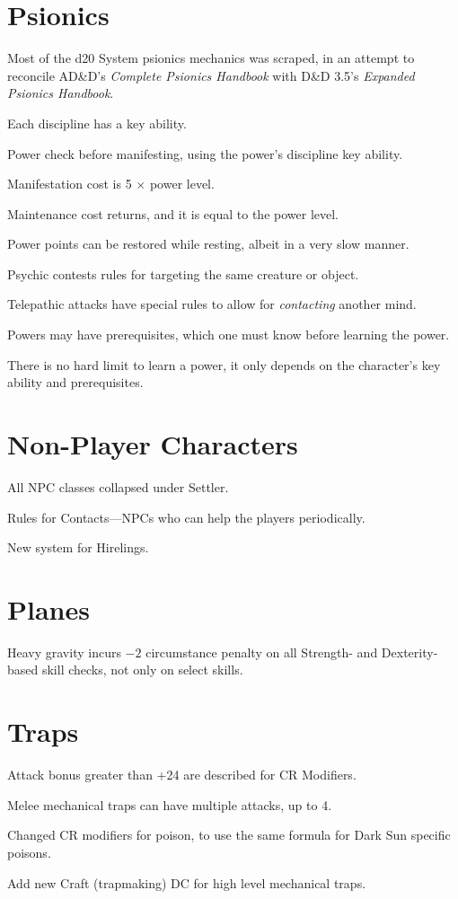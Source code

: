\section{Psionics}
Most of the d20 System psionics mechanics was scraped, in an attempt to reconcile AD\&D's \emph{Complete Psionics Handbook} with D\&D 3.5's \emph{Expanded Psionics Handbook}.
\begin{itemize*}
\item Each discipline has a key ability.
\item Power check before manifesting, using the power's discipline key ability.
\item Manifestation cost is 5 $\times$ power level.
\item Maintenance cost returns, and it is equal to the power level.
\item Power points can be restored while resting, albeit in a very slow manner.
\item Psychic contests rules for targeting the same creature or object.
\item Telepathic attacks have special rules to allow for \emph{contacting} another mind.
\item Powers may have prerequisites, which one must know before learning the power.
\item There is no hard limit to learn a power, it only depends on the character's key ability and prerequisites.
\end{itemize*}

\section{Non-Player Characters}
\begin{itemize*}
\item All NPC classes collapsed under Settler.
\item Rules for Contacts---NPCs who can help the players periodically.
\item New system for Hirelings.
\end{itemize*}

\section{Planes}
Heavy gravity incurs $-2$ circumstance penalty on all Strength- and Dexterity-based skill checks, not only on select skills.

\section{Traps}
\begin{itemize*}
\item Attack bonus greater than +24 are described for CR Modifiers.
\item Melee mechanical traps can have multiple attacks, up to 4.
\item Changed CR modifiers for poison, to use the same formula for {\tableheader Dark Sun} specific poisons.
\item Add new Craft (trapmaking) DC for high level mechanical traps.
\end{itemize*}

